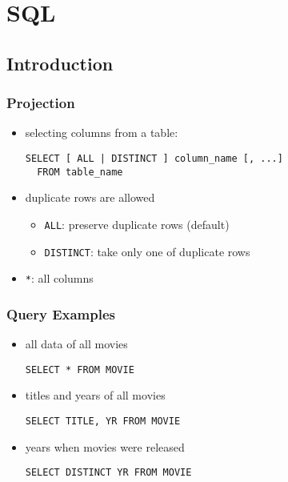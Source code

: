 \documentclass[dvipsnames]{beamer}
\theoremstyle{plain}
\begin{document}
\lstset{language=FullSQL}

\section{SQL}

\subsection{Introduction}

\begin{frame}[fragile]
  \frametitle{Projection}

  \begin{itemize}
    \item selecting columns from a table:
    \begin{lstlisting}
SELECT [ ALL | DISTINCT ] column_name [, ...]
  FROM table_name
    \end{lstlisting}

    \pause
    \medskip
    \item duplicate rows are allowed
    \begin{itemize}
        \item \lstinline!ALL!: preserve duplicate rows (default)
        \item \lstinline!DISTINCT!: take only one of duplicate rows
    \end{itemize}

    \medskip
    \item \lstinline!*!: all columns
  \end{itemize}
\end{frame}

\begin{frame}[fragile]
  \frametitle{Query Examples}

  \begin{itemize}
    \item all data of all movies
    \begin{lstlisting}
SELECT * FROM MOVIE
    \end{lstlisting}

    \pause
    \item titles and years of all movies
    \begin{lstlisting}
SELECT TITLE, YR FROM MOVIE
    \end{lstlisting}

    \pause
    \item years when movies were released
    \begin{lstlisting}
SELECT DISTINCT YR FROM MOVIE
    \end{lstlisting}
  \end{itemize}
\end{frame}
\end{document}
